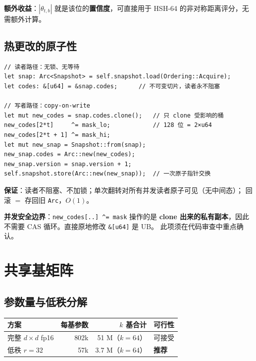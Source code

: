 \documentclass[11pt,a4paper]{ctexart}
\newcommand{\warn}[1]{\textcolor{warnred}{\textbf{#1}}}
\newcommand{\ok}[1]{\textcolor{okgreen}{\textbf{#1}}}
\theoremstyle{definition}
\begin{document}
\textbf{额外收益}：$|\theta_{t,b}|$ 就是该位的\textbf{置信度}，可直接用于
HSH-64 的非对称距离评分，无需额外计算。

\subsection{热更改的原子性}

\begin{lstlisting}[language=RustLang]
// 读者路径：无锁、无等待
let snap: Arc<Snapshot> = self.snapshot.load(Ordering::Acquire);
let codes: &[u64] = &snap.codes;      // 不可变切片，读者永不阻塞

// 写者路径：copy-on-write
let mut new_codes = snap.codes.clone();   // 只 clone 受影响的桶
new_codes[2*t]     ^= mask_lo;            // 128 位 = 2×u64
new_codes[2*t + 1] ^= mask_hi;
let mut new_snap = Snapshot::from(snap);
new_snap.codes = Arc::new(new_codes);
new_snap.version = snap.version + 1;
self.snapshot.store(Arc::new(new_snap));  // 一次原子指针交换
\end{lstlisting}

\textbf{保证}：读者不阻塞、不加锁；单次翻转对所有并发读者原子可见（无中间态）；
回滚 $=$ 存回旧 \texttt{Arc}，$O(1)$。

\warn{并发安全边界}：\texttt{new\_codes[..] \^{}= mask} 操作的是
\textbf{clone 出来的私有副本}，因此不需要 CAS 循环。直接原地修改 \texttt{\&[u64]} 是 UB。
此项须在代码审查中重点确认。

\section{共享基矩阵}\label{sec:basis}

\subsection{参数量与低秩分解}

\begin{center}
\begin{tabularx}{\textwidth}{@{}lrrX@{}}
\toprule
\textbf{方案} & \textbf{每基参数} & \textbf{$k$ 基合计} & \textbf{可行性} \\
\midrule
完整 $d\times d$ fp16 & 802k & 51 M（$k{=}64$） & 可接受 \\
低秩 $r{=}32$ & 57k & 3.7 M（$k{=}64$） & \ok{推荐} \\
\bottomrule
\end{tabularx}
\end{center}
\end{document}
